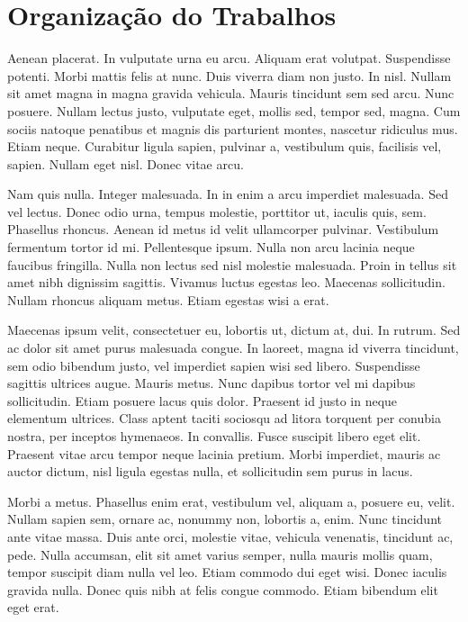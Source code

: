 \section{Organização do Trabalhos}

Aenean placerat. In vulputate urna eu arcu. Aliquam erat volutpat. Suspendisse potenti. Morbi mattis felis at nunc. Duis viverra diam non justo. In nisl. Nullam sit amet magna in magna gravida vehicula. Mauris tincidunt sem sed arcu. Nunc posuere. Nullam lectus justo, vulputate eget, mollis sed, tempor sed, magna. Cum sociis natoque penatibus et magnis dis parturient montes, nascetur ridiculus mus. Etiam neque. Curabitur ligula sapien, pulvinar a, vestibulum quis, facilisis vel, sapien. Nullam eget nisl. Donec vitae arcu.

Nam quis nulla. Integer malesuada. In in enim a arcu imperdiet malesuada. Sed vel lectus. Donec odio urna, tempus molestie, porttitor ut, iaculis quis, sem. Phasellus rhoncus. Aenean id metus id velit ullamcorper pulvinar. Vestibulum fermentum tortor id mi. Pellentesque ipsum. Nulla non arcu lacinia neque faucibus fringilla. Nulla non lectus sed nisl molestie malesuada. Proin in tellus sit amet nibh dignissim sagittis. Vivamus luctus egestas leo. Maecenas sollicitudin. Nullam rhoncus aliquam metus. Etiam egestas wisi a erat.

Maecenas ipsum velit, consectetuer eu, lobortis ut, dictum at, dui. In rutrum. Sed ac dolor sit amet purus malesuada congue. In laoreet, magna id viverra tincidunt, sem odio bibendum justo, vel imperdiet sapien wisi sed libero. Suspendisse sagittis ultrices augue. Mauris metus. Nunc dapibus tortor vel mi dapibus sollicitudin. Etiam posuere lacus quis dolor. Praesent id justo in neque elementum ultrices. Class aptent taciti sociosqu ad litora torquent per conubia nostra, per inceptos hymenaeos. In convallis. Fusce suscipit libero eget elit. Praesent vitae arcu tempor neque lacinia pretium. Morbi imperdiet, mauris ac auctor dictum, nisl ligula egestas nulla, et sollicitudin sem purus in lacus.

Morbi a metus. Phasellus enim erat, vestibulum vel, aliquam a, posuere eu, velit. Nullam sapien sem, ornare ac, nonummy non, lobortis a, enim. Nunc tincidunt ante vitae massa. Duis ante orci, molestie vitae, vehicula venenatis, tincidunt ac, pede. Nulla accumsan, elit sit amet varius semper, nulla mauris mollis quam, tempor suscipit diam nulla vel leo. Etiam commodo dui eget wisi. Donec iaculis gravida nulla. Donec quis nibh at felis congue commodo. Etiam bibendum elit eget erat.

